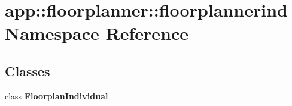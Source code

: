 \section{app::floorplanner::floorplannerind Namespace Reference}
\label{namespaceapp_1_1floorplanner_1_1floorplannerind}


\subsection*{Classes}
\begin{CompactItemize}
\item 
class {\bf FloorplanIndividual}
\end{CompactItemize}
